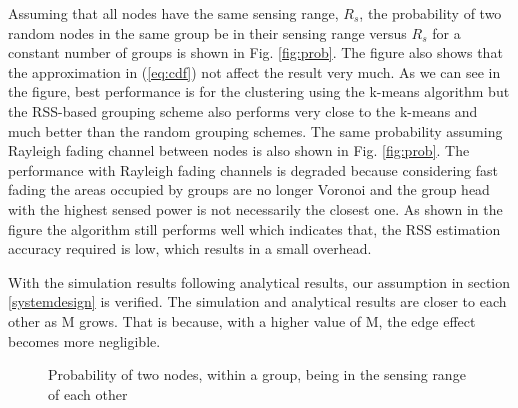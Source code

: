 Assuming that all nodes have the same sensing range, $R_s$, the probability of two random nodes in the same group be in their sensing range versus $R_s$ for a constant number of groups is shown in Fig. \ref{fig:prob}. The figure also shows that the approximation in (\ref{eq:cdf}) not affect the result very much. As we can see in the figure, best performance is for the clustering using the k-means algorithm but the RSS-based grouping scheme also performs very close to the k-means and much better than the random grouping schemes. The same probability assuming Rayleigh fading channel between nodes is also shown in Fig. \ref{fig:prob}. The performance with Rayleigh fading channels is degraded because considering fast fading the areas occupied by groups are no longer Voronoi and the group head with the highest sensed power is not necessarily the closest one. As shown in the figure the algorithm still performs well which indicates that, the RSS estimation accuracy required is low, which results in a small overhead.

With the simulation results following analytical results, our assumption in section \ref{systemdesign} is verified. The simulation and analytical results are closer to each other as M grows. That is because, with a higher value of M, the edge effect becomes more negligible.


\begin{figure} [!tbp]
  \centering
  \caption{Probability of two nodes, within a group, being in the sensing range of each other}
  \label{fig:probabilities}
\end{figure}


